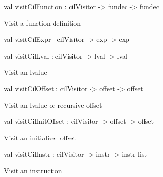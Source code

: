 \documentclass[11pt]{article}
\begin{document}
\label{val:Cil.visitCilFunction}\begin{ocamldoccode}
val visitCilFunction : cilVisitor -> fundec -> fundec
\end{ocamldoccode}
\begin{ocamldocdescription}
Visit a function definition


\end{ocamldocdescription}




\label{val:Cil.visitCilExpr}\begin{ocamldoccode}
val visitCilExpr : cilVisitor -> exp -> exp
\end{ocamldoccode}




\label{val:Cil.visitCilLval}\begin{ocamldoccode}
val visitCilLval : cilVisitor -> lval -> lval
\end{ocamldoccode}
\begin{ocamldocdescription}
Visit an lvalue


\end{ocamldocdescription}




\label{val:Cil.visitCilOffset}\begin{ocamldoccode}
val visitCilOffset : cilVisitor -> offset -> offset
\end{ocamldoccode}
\begin{ocamldocdescription}
Visit an lvalue or recursive offset


\end{ocamldocdescription}




\label{val:Cil.visitCilInitOffset}\begin{ocamldoccode}
val visitCilInitOffset : cilVisitor -> offset -> offset
\end{ocamldoccode}
\begin{ocamldocdescription}
Visit an initializer offset


\end{ocamldocdescription}




\label{val:Cil.visitCilInstr}\begin{ocamldoccode}
val visitCilInstr : cilVisitor -> instr -> instr list
\end{ocamldoccode}
\begin{ocamldocdescription}
Visit an instruction


\end{ocamldocdescription}
\end{document}
